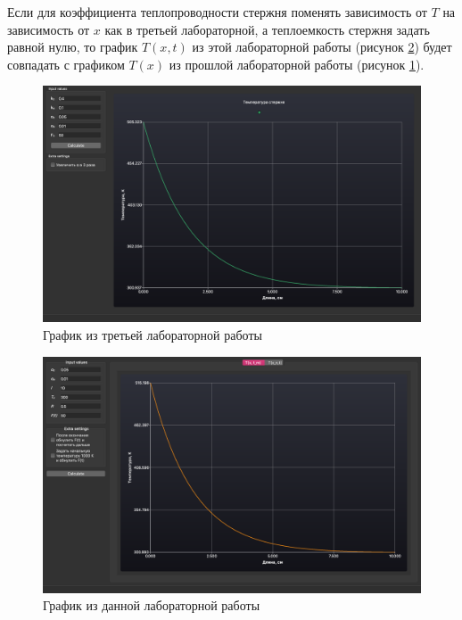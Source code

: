\begin{enumerate}
        Если для коэффициента теплопроводности стержня поменять зависимость от $T$ на зависимость от $x$ как в третьей лабораторной, а теплоемкость стержня задать равной нулю, то график $T(x, t)$ из этой лабораторной работы (рисунок \ref{img:lab_03_new}) будет совпадать с графиком $T(x)$ из прошлой лабораторной работы (рисунок \ref{img:lab_03}).

        \begin{figure}[H]
            \centering
            \includegraphics[scale=0.35]{img/lab_03.png}
            \caption{График из третьей лабораторной работы}
            \label{img:lab_03}
        \end{figure}

        \begin{figure}[H]
            \centering
            \includegraphics[scale=0.35]{img/lab_03_new.png}
            \caption{График из данной лабораторной работы}
            \label{img:lab_03_new}
        \end{figure}


\end{enumerate}
